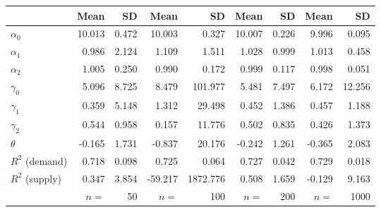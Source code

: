 
\begin{tabular}[t]{lrrrrrrrr}
\toprule
  & Mean & SD & Mean  & SD  & Mean   & SD   & Mean    & SD   \\
\midrule
$\alpha_{0}$ & 10.013 & 0.472 & 10.003 & 0.327 & 10.007 & 0.226 & 9.996 & 0.095\\
$\alpha_{1}$ & 0.986 & 2.124 & 1.109 & 1.511 & 1.028 & 0.999 & 1.013 & 0.458\\
$\alpha_{2}$ & 1.005 & 0.250 & 0.990 & 0.172 & 0.999 & 0.117 & 0.998 & 0.051\\
$\gamma_{0}$ & 5.096 & 8.725 & 8.479 & 101.977 & 5.481 & 7.497 & 6.172 & 12.256\\
$\gamma_{1}$ & 0.359 & 5.148 & 1.312 & 29.498 & 0.452 & 1.386 & 0.457 & 1.188\\
$\gamma_{2}$ & 0.544 & 0.958 & 0.157 & 11.776 & 0.502 & 0.835 & 0.426 & 1.373\\
$\theta$ & -0.165 & 1.731 & -0.837 & 20.176 & -0.242 & 1.261 & -0.365 & 2.083\\
$R^{2}$ (demand) & 0.718 & 0.098 & 0.725 & 0.064 & 0.727 & 0.042 & 0.729 & 0.018\\
$R^{2}$ (supply) & 0.347 & 3.854 & -59.217 & 1872.776 & 0.508 & 1.659 & -0.129 & 9.163\\
 & $n =$ & 50 & $n =$ & 100 & $n =$ & 200 & $n =$ & 1000\\
\bottomrule
\end{tabular}
